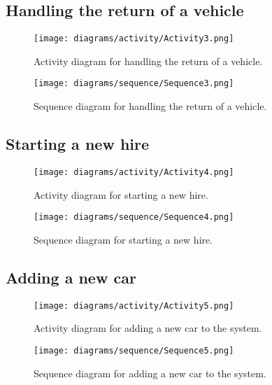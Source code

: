   \newpage

  \subsection{Handling the return of a vehicle}
    \begin{figure}[H]
      \centering
      \texttt{[image: diagrams/activity/Activity3.png]}
      \caption{Activity diagram for handling the return of a vehicle.}
      \label{fig:vehicleReturnActivity}
    \end{figure}

    \begin{figure}[H]
      \centering
      \texttt{[image: diagrams/sequence/Sequence3.png]}
      \caption{Sequence diagram for handling the return of a vehicle.}
      \label{fig:vehicleReturnSequence}
    \end{figure}
  \newpage

  \subsection{Starting a new hire}
    \begin{figure}[H]
      \centering
      \texttt{[image: diagrams/activity/Activity4.png]}
      \caption{Activity diagram for starting a new hire.}
      \label{fig:hireStartActivity}
    \end{figure}

    \begin{figure}[H]
      \centering
      \texttt{[image: diagrams/sequence/Sequence4.png]}
      \caption{Sequence diagram for starting a new hire.}
      \label{fig:startHireSequence}
    \end{figure}
  \newpage

  \subsection{Adding a new car}

    \begin{figure}[H]
      \centering
      \texttt{[image: diagrams/activity/Activity5.png]}
      \caption{Activity diagram for adding a new car to the system.}
      \label{fig:newCarActivity}
    \end{figure}

    \begin{figure}[H]
      \centering
      \texttt{[image: diagrams/sequence/Sequence5.png]}
      \caption{Sequence diagram for adding a new car to the system.}
      \label{fig:newCarSequence}
    \end{figure}

\newpage
